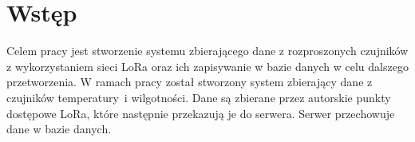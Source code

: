 
\chapter*{Wstęp} %

Celem pracy jest stworzenie systemu zbierającego dane z rozproszonych czujników z wykorzystaniem sieci LoRa oraz ich zapisywanie w bazie danych w celu dalszego przetworzenia.
W ramach pracy został stworzony system zbierający dane z czujników temperatury~i wilgotności.
Dane są zbierane przez autorskie punkty dostępowe LoRa, które następnie przekazują je do serwera.
Serwer przechowuje dane w bazie danych.
